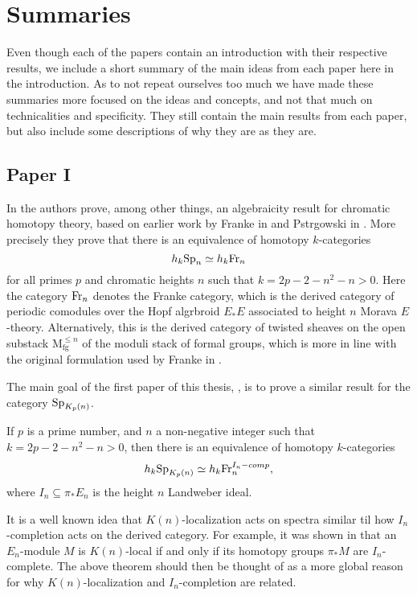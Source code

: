 \section{Summaries}

Even though each of the papers contain an introduction with their respective results, we include a short summary of the main ideas from each paper here in the introduction. As to not repeat ourselves too much we have made these summaries more focused on the ideas and concepts, and not that much on technicalities and specificity. They still contain the main results from each paper, but also include some descriptions of why they are as they are. 

\subsection{Paper I}

In \cite{patchkoria-pstragowski_2021} the authors prove, among other things, an algebraicity result for chromatic homotopy theory, based on earlier work by Franke in \cite{franke_96} and Pstr\a{}gowski in \cite{pstragowski_2021}. More precisely they prove that there is an equivalence of homotopy $k$-categories 
\[h_k \mathrm{Sp}_{n} \simeq h_k \mathrm{Fr}_{n}\]
for all primes $p$ and chromatic heights $n$ such that $k = 2p-2-n^2-n > 0$. Here the category $\mathrm{Fr}_{n}$ denotes the Franke category, which is the derived category of periodic comodules over the Hopf algrbroid $E_*E$ associated to height $n$ Morava $E$-theory. Alternatively, this is the derived category of twisted sheaves on the open substack $\mathrm{M}_{\mathrm{fg}}^{\leq n}$ of the moduli stack of formal groups, which is more in line with the original formulation used by Franke in \cite{franke_96}. 

The main goal of the first paper of this thesis, \cite{aambo_2024_algebraicity}, is to prove a similar result for the category $\mathrm{Sp}_{K_p(n)}$. 

\begin{theorem}
    \label{ch0:summary1:thm:main}
    If $p$ is a prime number, and $n$ a non-negative integer such that $k = 2p-2-n^2-n > 0$, then there is an equivalence of homotopy $k$-categories 
    \[h_k \mathrm{Sp}_{K_p(n)} \simeq h_k\mathrm{Fr}_{n}^{I_n-comp},\]
    where $I_n \subseteq \pi_* E_n$ is the height $n$ Landweber ideal. 
\end{theorem}

It is a well known idea that $K(n)$-localization acts on spectra similar til how $I_n$-completion acts on the derived category. For example, it was shown in \citeme that an $E_n$-module $M$ is $K(n)$-local if and only if its homotopy groups $\pi_* M$ are $I_n$-complete. The above theorem should then be thought of as a more global reason for why $K(n)$-localization and $I_n$-completion are related. 

